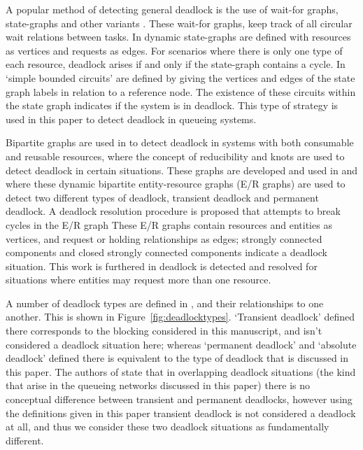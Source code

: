 \documentclass{article}
\numberwithin{equation}{section}
\begin{document}
A popular method of detecting general deadlock is the use of wait-for graphs,
state-graphs and other variants \cite{cheng90, elmagarmid86, coffmanelphick71,
choetal95, deuermeyeretal97, venkateshetal98, venkateshsmith03,
venkateshsmith05, holt72}.
These wait-for graphs, keep track of all circular wait relations between tasks.
In \cite{coffmanelphick71} dynamic state-graphs are defined with resources as
vertices and requests as edges.
For scenarios where there is only one type of each resource, deadlock arises
if and only if the state-graph contains a cycle.
In \cite{choetal95} `simple bounded circuits' are defined by giving the
vertices and edges of the state graph labels in relation to a reference node.
The existence of these circuits within the state graph indicates if the system
is in deadlock.
This type of strategy is used in this paper to detect deadlock in queueing
systems.

Bipartite graphs are used in \cite{holt72} to detect deadlock in systems with
both consumable and reusable resources, where the concept of reducibility and
knots are used to detect deadlock in certain situations.
These graphs are developed and used in \cite{deuermeyeretal97} and
\cite{venkateshsmith03} where these dynamic bipartite entity-resource graphs
(E/R graphs) are used to detect two different types of deadlock, transient
deadlock and permanent deadlock. A deadlock resolution procedure is proposed
that attempts to break cycles in the E/R graph
These E/R graphs contain resources and entities as vertices, and request or
holding relationships as edges; strongly connected components and closed
strongly connected components indicate a deadlock situation.
This work is furthered in \cite{venkateshetal98} deadlock is detected and
resolved for situations where entities may request more than one resource.

A number of deadlock types are defined in \cite{venkateshetal98}, and their
relationships to one another.
This is shown in Figure~\ref{fig:deadlocktypes}.
`Transient deadlock' defined there corresponds to the blocking considered in
this manuscript, and isn't considered a deadlock situation here; whereas
`permanent deadlock' and `absolute deadlock' defined there is equivalent to
the type of deadlock that is discussed in this paper.
The authors of \cite{venkateshetal98} state that in overlapping deadlock
situations (the kind that arise in the queueing networks discussed in this
paper) there is no conceptual difference between transient and permanent
deadlocks, however using the definitions given in this paper transient
deadlock is not considered a deadlock at all, and thus we consider these two
deadlock situations as fundamentally different.
\end{document}
